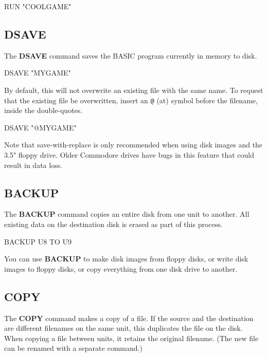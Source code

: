 \begin{screencode}
RUN "COOLGAME"
\end{screencode}

\subsection{DSAVE}

The {\bf DSAVE} command saves the BASIC program currently in memory to disk.

\begin{screencode}
DSAVE "MYGAME"
\end{screencode}

By default, this will not overwrite an existing file with the same name. To request that the existing file be overwritten, insert an {\tt @} (at) symbol before the filename, inside the double-quotes.

\begin{screencode}
DSAVE "@MYGAME"
\end{screencode}

Note that save-with-replace is only recommended when using disk images and the 3.5" floppy drive. Older Commodore drives have bugs in this feature that could result in data loss.

\subsection{BACKUP}

The {\bf BACKUP} command copies an entire disk from one unit to another. All existing data on the destination disk is erased as part of this process.

\begin{screencode}
BACKUP U8 TO U9
\end{screencode}

You can use {\bf BACKUP} to make disk images from floppy disks, or write disk images to floppy disks, or copy everything from one disk drive to another.

\subsection{COPY}

The {\bf COPY} command makes a copy of a file. If the source and the destination are different filenames on the same unit, this duplicates the file on the disk. When copying a file between units, it retains the original filename. (The new file can be renamed with a separate command.)

